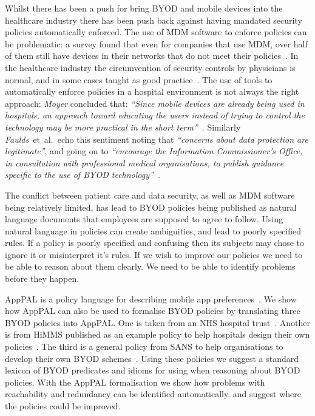 \documentclass[a4paper]{article}
\makeatletter
\newcommand{\etal}[0]{et~al{.}\@}
\newcommand{\apppal}[0]{App{P}{A}{L}}
\makeatother
\begin{document}
Whilst there has been a push for bring \ac{BYOD} and mobile devices into the healthcare industry there has been push back against having mandated security policies automatically enforced.  
The use of \ac{MDM} software to enforce policies can be problematic:
  a survey found that even for companies that use \ac{MDM}, over half of them still have devices in their networks that do not meet their policies~\cite{mobileiron_security_labs_q4_2015}.
In the healthcare industry the circumvention of security controls by physicians is normal, and in some cases taught as good practice~\cite{koppel_workarounds_2015}.
The use of tools to automatically enforce policies in a hospital environment is not always the right approach:
\emph{Moyer} concluded that:
\emph{``Since mobile devices are already being used in hospitals, an approach toward educating the users instead of trying to control the technology may be more practical in the short term''}~\cite{moyer_managing_2013}.
Similarly \emph{Faulds}~\etal~echo this sentiment noting that \emph{``concerns about data protection are legitimate''}, and going on to \emph{``encourage the Information Commissioner’s Office, in consultation with professional medical organisations, to publish guidance specific to the use of BYOD technology''}~\cite{faulds_feasibility_2016}.

The conflict between patient care and data security, as well as \ac{MDM} software being relatively limited, has lead to \ac{BYOD} policies being published as natural language documents that employees are supposed to agree to follow.
Using natural language in policies can create ambiguities, and lead to poorly specified rules.
If a policy is poorly specified and confusing then its subjects may chose to ignore it or misinterpret it's rules.
If we wish to improve our policies we need to be able to reason about them clearly.
We need to be able to identify problems before they happen.


\apppal{} is a policy language for describing mobile app preferences~\cite{hallett_apppal_2016}.
We show how \apppal{} can also be used to formalise \ac{BYOD} policies by translating three \ac{BYOD} policies into \apppal{}.
One is taken from an NHS hospital trust~\cite{kennington_mobiles_2014}. 
Another is from HiMMS published as an example policy to help hospitals design their own policies~\cite{healthcare_information_and_management_systems_society_mobile_2012}.
The third is a  general policy from SANS to help organisations to develop their own \ac{BYOD} schemes~\cite{nicholas_r._c._guerin_security_2008}.
Using these policies we suggest a standard lexicon of BYOD predicates and idioms for using when reasoning about \ac{BYOD} policies. 
With the AppPAL formalisation we show how problems with reachability and redundancy can be identified automatically, and suggest where the policies could be improved.
\end{document}

